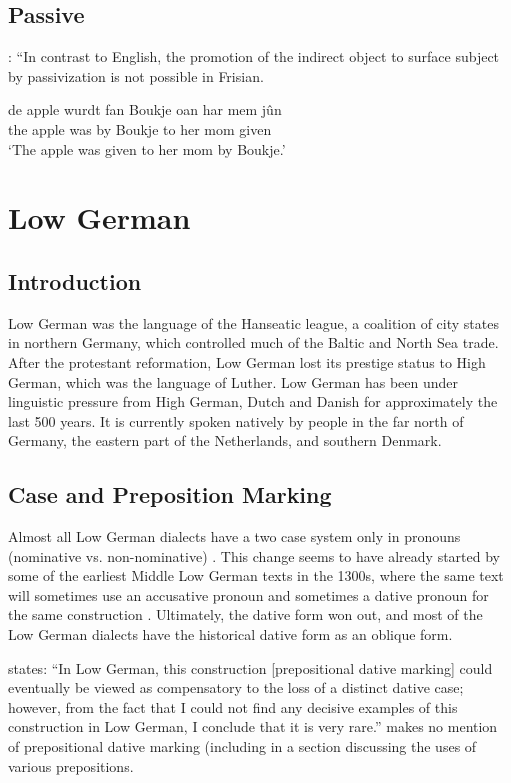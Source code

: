 \subsection{Passive}
\cite[110-111]{Tiersma.1985}: ``In contrast to English, the promotion of the indirect object to surface subject by passivization is not possible in Frisian.
\begin{exe}
\ex \gll de apple wurdt fan Boukje oan har mem jûn\\
the apple was by Boukje to her mom given\\
\trans `The apple was given to her mom by Boukje.'
\end{exe}

\section{Low German}\label{sec:LGerman}
\subsection{Introduction}
Low German was the language of the Hanseatic league, a coalition of city states in northern Germany, which controlled much of the Baltic and North Sea trade. After the protestant reformation, Low German lost its prestige status to High German, which was the language of Luther. Low German has been under linguistic pressure from High German, Dutch and Danish for approximately the last 500 years. It is currently spoken natively by people in the far north of Germany, the eastern part of the Netherlands, and southern Denmark.
\subsection{Case and Preposition Marking}
Almost all Low German dialects have a two case system only in pronouns (nominative vs. non-nominative) \citep{Shrier.1965,Lindow.1998}. This change seems to have already started by some of the earliest Middle Low German texts in the 1300s, where the same text will sometimes use an accusative pronoun and sometimes a dative pronoun for the same construction \citep{Lasch.1914,Boden.1993}. Ultimately, the dative form won out, and most of the Low German dialects have the historical dative form as an oblique form. 

\cite{Fleischer.2006} states: ``In Low German, this construction [prepositional dative marking] could eventually be viewed as compensatory to the loss of a distinct dative case; however, from the fact that I could not find any decisive examples of this construction in Low German, I conclude that it is very rare.'' \cite{Lindow.1998} makes no mention of prepositional dative marking (including in a section discussing the uses of various prepositions.
